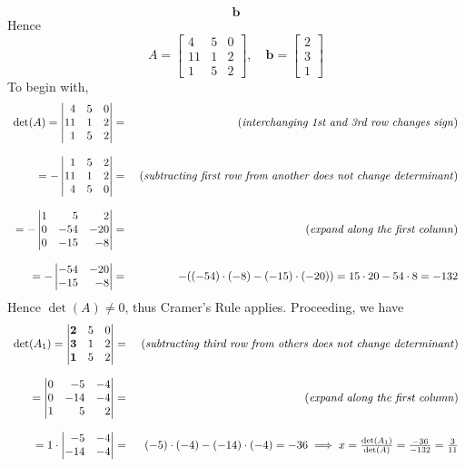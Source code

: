 \documentclass[8pt]{article} %
\begin{document}
\begin{description}
{\[				\mathbf{b}\]
			Hence
			\[A=\begin{bmatrix}4&5&0\\11&1&2\\1&5&2\end{bmatrix},\quad \mathbf{b}=\begin{bmatrix}2\\3\\1\end{bmatrix}\]
			To begin with,
			\[\begin{array}{rr}
			\det(A)=\begin{vmatrix*}[r]4&5&0\\11&1&2\\1&5&2\end{vmatrix*}
			= &\mbox{ (\textit{interchanging 1st and 3rd row changes sign})}\\\\
			=-\begin{vmatrix*}[r]1&5&2\\11&1&2\\4&5&0\end{vmatrix*}=
			&\mbox{ (\textit{subtracting first row from another does not change determinant})}\\\\
			=-\begin{vmatrix*}[r]1&5&2\\0&-54&-20\\0&-15&-8\end{vmatrix*}=
			&\mbox{ (\textit{expand along the first column})}\\\\
			=-\begin{vmatrix*}[r]-54&-20\\-15&-8\end{vmatrix*}=&-((-54)\cdot(-8)-(-15)\cdot(-20))=15\cdot20-54\cdot8=-132
			\end{array}\]
			Hence $\det(A)\neq 0$, thus Cramer's Rule applies. Proceeding, we have
			\[\begin{array}{rr}
			\det(A_1)=\begin{vmatrix*}[r]\mathbf{2}&5&0\\\mathbf{3}&1&2\\\mathbf{1}&5&2\end{vmatrix*}
			= &\mbox{ (\textit{subtracting third row from others does not change determinant})}\\\\
			=\begin{vmatrix*}[r]0&-5&-4\\0&-14&-4\\{1}&5&2\end{vmatrix*}
			= &\mbox{ (\textit{expand along the first column})}\\\\
			=1\cdot
			\begin{vmatrix*}[r]-5&-4\\-14&-4\end{vmatrix*}=&(-5)\cdot(-4)-(-14)\cdot(-4)=-36\implies x=\frac{\det(A_1)}{\det(A)}=
				\frac{-36}{-132}=\frac{3}{11}
			\end{array}\]

}
\end{description}
\end{document}
